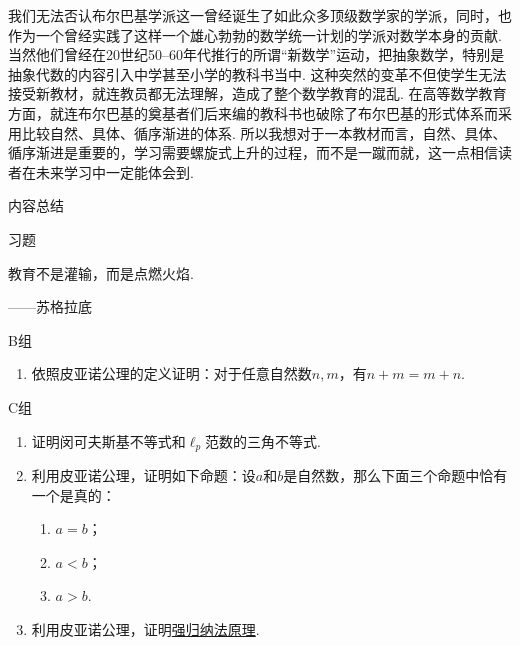 我们无法否认布尔巴基学派这一曾经诞生了如此众多顶级数学家的学派，同时，也作为一个曾经实践了这样一个雄心勃勃的数学统一计划的学派对数学本身的贡献. 当然他们曾经在20世纪50--60年代推行的所谓``新数学''运动，把抽象数学，特别是抽象代数的内容引入中学甚至小学的教科书当中. 这种突然的变革不但使学生无法接受新教材，就连教员都无法理解，造成了整个数学教育的混乱. 在高等数学教育方面，就连布尔巴基的奠基者们后来编的教科书也破除了布尔巴基的形式体系而采用比较自然、具体、循序渐进的体系. 所以我想对于一本教材而言，自然、具体、循序渐进是重要的，学习需要螺旋式上升的过程，而不是一蹴而就，这一点相信读者在未来学习中一定能体会到.

\vspace{2ex}
\centerline{\heiti \Large 内容总结}

\vspace{2ex}
\centerline{\heiti \Large 习题}

\vspace{2ex}
{\kaishu 教育不是灌输，而是点燃火焰.}
\begin{flushright}
    \kaishu
    ——苏格拉底
\end{flushright}

\centerline{\heiti B组}
\begin{enumerate}
    \item 依照皮亚诺公理的定义证明：对于任意自然数$n,m$，有$n+m=m+n$.
\end{enumerate}

\centerline{\heiti C组}
\begin{enumerate}
    \item 证明闵可夫斯基不等式和$\ell_p$范数的三角不等式.

    \item 利用皮亚诺公理，证明如下命题：设$a$和$b$是自然数，那么下面三个命题中恰有一个是真的：
          \begin{enumerate}
              \item $a=b$；

              \item $a<b$；

              \item $a>b$.
          \end{enumerate}

    \item 利用皮亚诺公理，证明\hyperref[thm:1e:强归纳法原理]{强归纳法原理}.
\end{enumerate}

